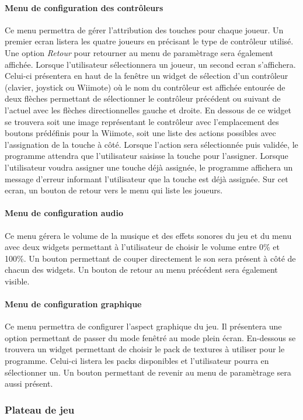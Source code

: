 \paragraph{Menu de configuration des contrôleurs}

Ce menu permettra de gérer l'attribution des touches pour chaque joueur. Un premier ecran listera les quatre joueurs en précisant le type de contrôleur utilisé. Une option \emph{Retour} pour retourner au menu de paramètrage sera également affichée. Lorsque l'utilisateur sélectionnera un joueur, un second ecran s'affichera. Celui-ci présentera en haut de la fenêtre un widget de sélection d'un contrôleur (clavier, joystick ou Wiimote) où le nom du contrôleur est affichée entourée de deux flèches permettant de sélectionner le contrôleur précédent ou suivant de l'actuel avec les flèches directionnelles gauche et droite. En dessous de ce widget se trouvera soit une image représentant le contrôleur avec l'emplacement des boutons prédéfinis pour la Wiimote, soit une liste des actions possibles avec l'assignation de la touche à côté. Lorsque l'action sera sélectionnée puis validée, le programme attendra que l'utilisateur saisisse la touche pour l'assigner. Lorsque l'utilisateur voudra assigner une touche déjà assignée, le programme affichera un message d'erreur informant l'utilisateur que la touche est déjà assignée. Sur cet ecran, un bouton de retour vers le menu qui liste les joueurs.

\paragraph{Menu de configuration audio}

Ce menu gérera le volume de la musique et des effets sonores du jeu et du menu avec deux widgets permettant à l'utilisateur de choisir le volume entre 0\% et 100\%. Un bouton permettant de couper directement le son sera présent à côté de chacun des widgets. Un bouton de retour au menu précédent sera également visible.

\paragraph{Menu de configuration graphique}

Ce menu permettra de configurer l'aspect graphique du jeu. Il présentera une option permettant de passer du mode fenêtré au mode plein écran. En-dessous se trouvera un widget permettant de choisir le pack de textures à utiliser pour le programme. Celui-ci listera les packs disponibles et l'utilisateur pourra en sélectionner un. Un bouton permettant de revenir au menu de paramètrage sera aussi présent.

\subsubsection{Plateau de jeu}

